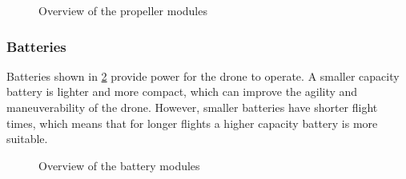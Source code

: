 \documentclass[sigconf,review]{acmart}
\begin{document}
\begin{figure}[htbp]
    \hfill
    \hfill
    \caption{Overview of the propeller modules}
    \label{fig:propeller}
\end{figure}

\subsubsection{Batteries}
\label{sec:batteries}

Batteries shown in \cref{fig:batteries} provide power for the drone to operate. 
A smaller capacity battery is lighter and more compact, which can improve the agility and maneuverability of the drone. 
However, smaller batteries have shorter flight times, which means that for longer flights a higher capacity battery is more suitable.

\begin{figure}[htbp]
    \hfill
    \hfill
    \caption{Overview of the battery modules}
    \label{fig:batteries}
\end{figure}
\end{document}

